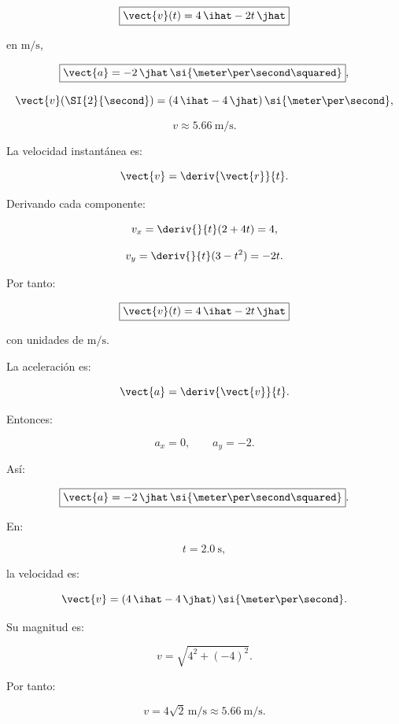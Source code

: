 \begin{respuesta}
\[
\boxed{
\vect{v}(t)
=
4\,\ihat-2t\,\jhat
}
\]

en \(\si{\meter\per\second}\),

\[
\boxed{
\vect{a}
=
-2\,\jhat\,
\si{\meter\per\second\squared}
},
\]

\[
\vect{v}(\SI{2}{\second})
=
(4\,\ihat-4\,\jhat)\,
\si{\meter\per\second},
\]

\[
\boxed{v\approx\SI{5.66}{\meter\per\second}}.
\]
\end{respuesta}

\begin{explicacion}
La velocidad instantánea es:

\[
\vect{v}
=
\deriv{\vect{r}}{t}.
\]

Derivando cada componente:

\[
v_x
=
\deriv{}{t}(2+4t)
=
4,
\]

\[
v_y
=
\deriv{}{t}(3-t^2)
=
-2t.
\]

Por tanto:

\[
\boxed{
\vect{v}(t)
=
4\,\ihat-2t\,\jhat
}
\]

con unidades de \(\si{\meter\per\second}\).

La aceleración es:

\[
\vect{a}
=
\deriv{\vect{v}}{t}.
\]

Entonces:

\[
a_x=0,
\qquad
a_y=-2.
\]

Así:

\[
\boxed{
\vect{a}
=
-2\,\jhat\,
\si{\meter\per\second\squared}
}.
\]

En:

\[
t=\SI{2.0}{\second},
\]

la velocidad es:

\[
\vect{v}
=
(4\,\ihat-4\,\jhat)\,
\si{\meter\per\second}.
\]

Su magnitud es:

\[
v
=
\sqrt{4^2+(-4)^2}.
\]

Por tanto:

\[
\boxed{
v
=
4\sqrt{2}\,\si{\meter\per\second}
\approx
\SI{5.66}{\meter\per\second}
}.
\]
\end{explicacion}


